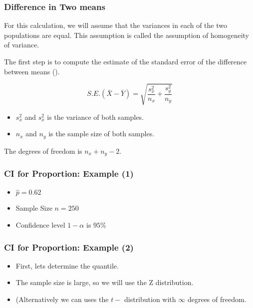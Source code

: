 \begin{frame}
\frametitle{Difference in Two means}
For this calculation, we will assume that the variances in each of the two populations are equal. This assumption is called the assumption of homogeneity of variance.

The first step is to compute the estimate of the standard error of the difference between means ().

\[ S.E.(\bar{X}-\bar{Y}) = \sqrt{\frac{s^2_x}{n_x} + \frac{s^2_y}{n_y}} \]

\begin{itemize}
\item $s^2_x$ and $s^2_x$ is the variance of both samples.
\item $n_x$ and $n_y$ is the sample size of both samples.
\end{itemize}
The degrees of freedom is $n_x + n_y -2$.
\end{frame}































\begin{frame}
\frametitle{CI for Proportion: Example (1)}

\begin{itemize}
\item $\hat{p}  = 0.62$
\item Sample Size $n=250$
\item Confidence level $1-\alpha$ is $95\%$
\end{itemize}

\end{frame}

\begin{frame}\frametitle{CI for Proportion: Example (2)}

\begin{itemize}
\item First, lets determine the quantile.
\item The sample size is large, so we will use the Z distribution.
\item (Alternatively we can uses the $t-$ distribution with $\infty$ degrees of freedom.
\end{itemize}

\end{frame}


